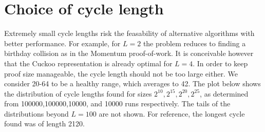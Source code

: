 \documentclass[11pt, oneside]{article}
\begin{document}
\section{Choice of cycle length}
Extremely small cycle lengths risk the feasability of alternative algorithms with better performance.
For example, for $L=2$ the problem reduces to finding a birthday collision
as in the Momentum proof-of-work.
It is conceivable however that the Cuckoo representation is already optimal for $L=4$.
In order to keep proof size manageable, the cycle length should not be too large either.
We consider 20-64 to be a healthy range, which averages to 42.
The plot below shows the distribution of cycle lengths found for sizes $2^{10},2^{15},2^{20},2^{25}$,
as determined from 100000,100000,10000, and 10000 runs respectively. The tails of the distributions
beyond $L=100$ are not shown. For reference, the longest cycle found was of length 2120.
\end{document}
